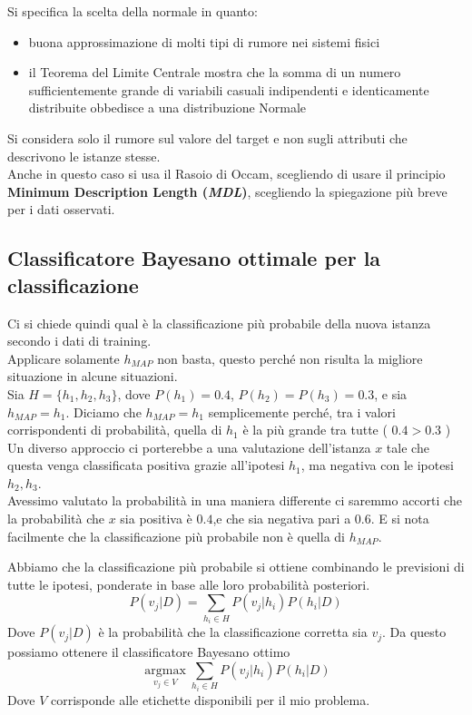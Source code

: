 Si specifica la scelta della normale in quanto:
\begin{itemize}
  \item buona approssimazione di molti tipi di rumore nei sistemi fisici 
  \item il Teorema del Limite Centrale mostra che la somma di un numero sufficientemente grande di variabili casuali indipendenti e identicamente distribuite obbedisce a una distribuzione Normale
\end{itemize}

Si considera solo il rumore sul valore del target e non sugli attributi che descrivono le istanze stesse.\\ 
Anche in questo caso si usa il Rasoio di Occam, scegliendo di usare il principio \textbf{Minimum Description Length (\textit{MDL})}, scegliendo la spiegazione più breve per i dati osservati.\\


\subsection{Classificatore Bayesano ottimale per la classificazione}
Ci si chiede quindi qual è la classificazione più probabile della nuova istanza secondo i dati di training.\\
Applicare solamente $h_{MAP}$ non basta, questo perché non risulta la migliore situazione in alcune situazioni. \\

Sia $H = \{h_1,h_2,h_3\}$, dove $P(h_1)=  0.4$, $P(h_2) = P(h_3) =  0.3$, e sia $h_{MAP} = h_1$. Diciamo che $h_{MAP} = h_1$ semplicemente perché, tra i valori corrispondenti di probabilità, quella di $h_1$  è la più grande tra tutte ( $0.4 > 0.3$ )\\
Un diverso approccio ci porterebbe a una valutazione dell'istanza $x$ tale che questa venga classificata positiva grazie all'ipotesi $h_1$, ma negativa con le ipotesi $h_2, h_3$.\\
Avessimo valutato la probabilità in una maniera differente ci saremmo accorti che la probabilità che $x$ sia positiva è $0.4$,e che sia negativa pari a $0.6$.
E si nota facilmente che la classificazione più probabile non è quella di $h_{MAP}$.

Abbiamo che la classificazione più probabile si ottiene combinando le previsioni di tutte le ipotesi, ponderate in base alle loro probabilità posteriori.
 \[P(v_j|D)=\sum_{h_i\in H}P(v_j|h_i)P(h_i|D)\]
Dove $P(v_j|D)$ è la probabilità che la classificazione corretta sia $v_j$. Da questo possiamo ottenere il classificatore Bayesano ottimo 
\[\operatorname*{argmax}_{v_j\in V}\sum_{h_i\in H}P(v_j|h_i)P(h_i|D)\] Dove $V$ corrisponde alle etichette disponibili per il mio problema. 

